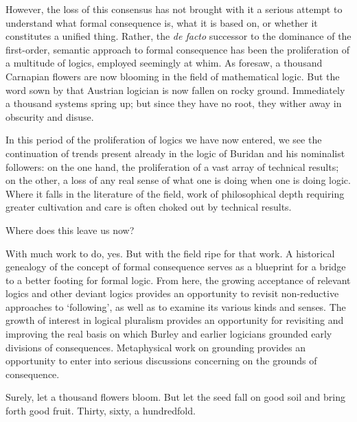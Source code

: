 \documentclass[]{article}
\begin{document}
		However, the loss of this consensus has not brought with it a serious attempt to understand what formal consequence is, what it is based on, or whether it constitutes a unified thing. Rather, the \textit{de facto} successor to the dominance of the first-order, semantic approach to formal consequence has been the proliferation of a multitude of logics, employed seemingly at whim. As \cite{Mehlberg1960} foresaw, a thousand Carnapian flowers are now blooming in the field of mathematical logic. But the word sown by that Austrian logician is now fallen on rocky ground. Immediately a thousand systems spring up; but since they have no root, they wither away in obscurity and disuse. 
		
		In this period of the proliferation of logics we have now entered, we see the continuation of trends present already in the logic of Buridan and his nominalist followers: on the one hand, the proliferation of a vast array of technical results; on the other, a loss of any real sense of what one is doing when one is doing logic. Where it falls in the literature of the field, work of philosophical depth requiring greater cultivation and care is often choked out by technical results.
		
		Where does this leave us now? 
		
		With much work to do, yes. But with the field ripe for that work. A historical genealogy of the concept of formal consequence serves as a blueprint for a bridge to a better footing for formal logic. From here, the growing acceptance of relevant logics and other deviant logics provides an opportunity to revisit non-reductive approaches to `following', as well as to examine its various kinds and senses. The growth of interest in logical pluralism provides an opportunity for revisiting and improving the real basis on which Burley and earlier logicians grounded early divisions of consequences. Metaphysical work on grounding provides an opportunity to enter into serious discussions concerning on the grounds of consequence.
		
		Surely, let a thousand flowers bloom. But let the seed fall on good soil and bring forth good fruit. Thirty, sixty, a hundredfold.
		\printbibliography
		
\end{document}
